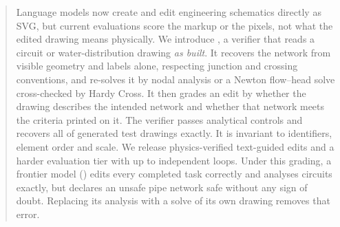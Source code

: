 \begin{abstract}
Language models now create and edit engineering schematics directly as SVG, but current evaluations score
the markup or the pixels, not what the edited drawing means physically. We introduce \ours, a verifier that
reads a circuit or water-distribution drawing \emph{as built}. It recovers the network from visible geometry
and labels alone, respecting junction and crossing conventions, and re-solves it by nodal analysis or a
Newton flow--head solve cross-checked by Hardy Cross. It then grades an edit by whether the drawing describes the
intended network and whether that network meets the criteria printed on it. The verifier passes
\numControls{} analytical controls and recovers all \roundTripTotal{} of \roundTripTotal{} generated test
drawings exactly. It is invariant to identifiers, element order and scale. We release \netEdits{} physics-verified
text-guided edits and a harder evaluation tier with up to \hardMaxLoopsDC{} independent loops. Under this
grading, a frontier model (\astra) edits every completed task correctly and analyses circuits exactly, but
declares an unsafe pipe network safe without any sign of doubt. Replacing its analysis with a solve of its
own drawing removes that error. \abstractOurs
\end{abstract}
